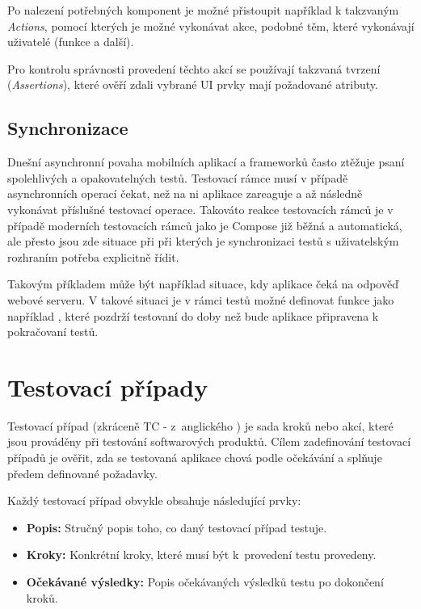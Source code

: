 Po nalezení potřebných komponent je možné přistoupit například k takzvaným \textit{Actions}, pomocí kterých je možné vykonávat akce, podobné
těm, které vykonávají uživatelé (funkce  a další).

Pro kontrolu správnosti provedení těchto akcí se používají takzvaná tvrzení (\textit{Assertions}), které ověří zdali vybrané UI prvky
mají požadované atributy. \cite{composeTesting}

\begin{sloppypar}
\subsection*{Synchronizace}
Dnešní asynchronní povaha mobilních aplikací a frameworků často ztěžuje psaní spolehlivých a opakovatelných testů. Testovací rámce
musí v případě asynchronních operací čekat, než na ni aplikace zareaguje a až následně vykonávat příslušné testovací operace. 
Takováto reakce testovacích rámců je v případě moderních testovacích rámců jako je Compose již běžná a automatická, ale přesto jsou zde
situace při při kterých je synchronizaci testů s uživatelským rozhraním potřeba explicitně řídit.

Takovým příkladem může být například situace, kdy aplikace čeká na odpověď webové serveru. V takové situaci je v rámci testů možné 
definovat funkce jako například , které pozdrží testovaní do doby než bude aplikace
připravena k pokračovaní testů.
\end{sloppypar}


\section{Testovací případy}\label{testCases}
Testovací případ (zkráceně TC - z~anglického ) je sada kroků nebo akcí, které jsou prováděny při testování softwarových produktů. 
Cílem zadefinování testovací případů je ověřit, zda se testovaná aplikace chová podle očekávání a splňuje předem definované požadavky. 

\bigskip

Každý testovací případ obvykle obsahuje následující prvky:

\begin{itemize}
  \item \textbf{Popis:} Stručný popis toho, co daný testovací případ testuje. %
  \item \textbf{Kroky:} Konkrétní kroky, které musí být k~provedení testu provedeny.
  \item \textbf{Očekávané výsledky:} Popis očekávaných výsledků testu po dokončení kroků.
\end{itemize}

